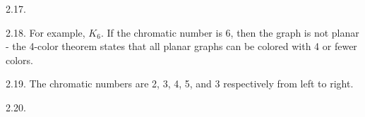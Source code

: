 \begin{itemize}
\begin{ans}{2.17.}
\end{ans}
\begin{ans}{2.18.}
		For example, $K_6$.  If the chromatic number is 6, then the graph is not planar - the 4-color theorem states that all planar graphs can be colored with 4 or fewer colors. %
	
\end{ans}
\begin{ans}{2.19.}
		The chromatic numbers are 2, 3, 4, 5, and 3 respectively from left to right. %
	
\end{ans}
\begin{ans}{2.20.}
	
\end{ans}
\end{itemize}
